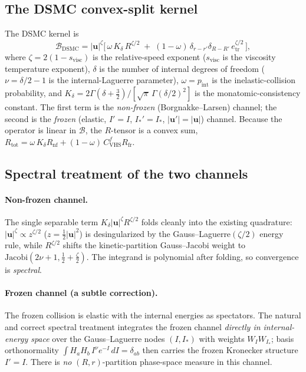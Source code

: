 \documentclass[11pt]{article}
\newcommand{\uu}{\mathbf{u}}
\begin{document}
\subsection{The DSMC convex-split kernel}
The DSMC kernel \cite[eqs.~(53)--(55)]{Djordjic2023} is
\begin{equation}
\mathcal{B}_{\mathrm{DSMC}}
= |\uu|^{\zeta}\Big[\,\omega\,K_\delta\,R^{\zeta/2}\;+\;(1-\omega)\,
\delta_{r-r'}\delta_{R-R'}\,e_{\mathrm{tr}}^{\zeta/2}\,\Big],
\label{eq:dsmc}
\end{equation}
where $\zeta=2(1-s_{\mathrm{visc}})$ is the relative-speed exponent
($s_{\mathrm{visc}}$ is the viscosity temperature exponent), $\delta$ is the number of internal
degrees of freedom ($\nu=\delta/2-1$ is the internal-Laguerre parameter), $\omega=p_{\mathrm{int}}$
is the inelastic-collision probability, and
$K_\delta=2\Gamma(\delta+\tfrac32)/[\sqrt\pi\,\Gamma(\delta/2)^2]$ is the monatomic-consistency
constant. The first term is the \emph{non-frozen} (Borgnakke--Larsen) channel; the second is the
\emph{frozen} (elastic, $I'=I$, $I_*'=I_*$, $|\uu'|=|\uu|$) channel. Because the operator is
linear in $\mathcal{B}$, the $R$-tensor is a convex sum,
$R_{\mathrm{tot}}=\omega\,K_\delta R_{\mathrm{nf}}+(1-\omega)\,C_{\mathrm{VHS}}^{f}R_{\mathrm{fr}}$.

\subsection{Spectral treatment of the two channels}
\paragraph{Non-frozen channel.}
The single separable term $K_\delta|\uu|^{\zeta}R^{\zeta/2}$ folds cleanly into the existing
quadrature: $|\uu|^\zeta\propto z^{\zeta/2}$ ($z=\tfrac12|\uu|^2$) is desingularized by the
Gauss--Laguerre$(\zeta/2)$ energy rule, while $R^{\zeta/2}$ shifts the kinetic-partition
Gauss--Jacobi weight to $\mathrm{Jacobi}(2\nu+1,\tfrac12+\tfrac\zeta2)$. The integrand is
polynomial after folding, so convergence is \emph{spectral}.

\paragraph{Frozen channel (a subtle correction).}
The frozen collision is elastic with the internal energies as spectators. The natural and
correct spectral treatment integrates the frozen channel \emph{directly in internal-energy
space} over the Gauss--Laguerre nodes $(I,I_*)$ with weights $W_I W_{I_*}$; basis
orthonormality $\int H_a H_b\,I^\nu e^{-I}\,dI=\delta_{ab}$ then carries the frozen Kronecker
structure $I'=I$. There is \emph{no} $(R,r)$-partition phase-space measure in this channel.
\end{document}
